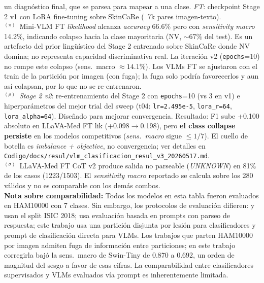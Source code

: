 \begin{table}[htbp]
\begin{minipage}{\textwidth}
  un diagnóstico final, que se parsea para mapear a una clase.
  \textit{FT}: checkpoint Stage 2 v1 con LoRA fine-tuning sobre SkinCaRe (~7k pares imagen-texto).\\[4pt]
  $^{(\pi)}$~Mini-VLM FT \textit{likelihood} alcanza \textit{accuracy} 66.6\% pero con
  \textit{sensitivity macro} 14.2\%, indicando colapso hacia la clase mayoritaria (NV, ${\sim}67\%$
  del test). Es un artefacto del prior lingüístico del Stage 2 entrenado sobre SkinCaRe
  donde NV domina; no representa capacidad discriminativa real.
  La iteración v2 (\texttt{epochs}=10) no rompe este colapso (sens.\ macro $\approx 14.1\%$).
  Los VLMs FT se ajustaron con el train de la partición por imagen (con fuga); la fuga solo podría
  favorecerlos y aun así colapsan, por lo que no se re-entrenaron.\\[4pt]
  $^{(\rho)}$~\textit{Stage 2 v2}: re-entrenamiento del Stage 2 con \texttt{epochs}=10 (vs 3 en v1)
  e hiperparámetros del mejor trial del sweep (t04: \texttt{lr=2.495e-5}, \texttt{lora\_r=64},
  \texttt{lora\_alpha=64}). Diseñado para mejorar convergencia. Resultado: F1 sube +0.100 absoluto
  en LLaVA-Med FT lik (+0.098$\to$0.198), pero \textbf{el class collapse persiste} en los modelos
  competitivos (\textit{sens.\ macro} sigue $\le 1/7$). El cuello de botella es \textit{imbalance + objective},
  no convergencia; ver detalles en \texttt{Codigo/docs/resul/vlm\_clasificacion\_resul\_v3\_20260517.md}.\\[4pt]
  $^{(\sigma)}$~LLaVA-Med FT CoT v2 produce salida no parseable (\textit{UNKNOWN}) en 81\% de los casos
  (1223/1503). El \textit{sensitivity macro} reportado se calcula sobre los 280 válidos y no es
  comparable con los demás combos.\\[4pt]
  \textbf{Nota sobre comparabilidad:}
  Todos los modelos en esta tabla fueron evaluados en HAM10000 con 7 clases.
  Sin embargo, los protocolos de evaluación difieren:
  \cite{SkinHealthMate2024} y~\cite{SkinSavvy22025} usan el split ISIC 2018;
  \cite{SkinR12025} usa evaluación basada en prompts con parseo de respuesta;
  este trabajo usa una partición disjunta por lesión para clasificadores y prompt
  de clasificación directa para VLMs. Los trabajos que parten HAM10000 por imagen admiten
  fuga de información entre particiones; en este trabajo corregirla bajó la sens.\ macro de Swin-Tiny
  de 0.870 a 0.692, un orden de magnitud del sesgo a favor de esas cifras.
  La comparabilidad entre clasificadores supervisados y VLMs evaluados
  vía prompt es inherentemente limitada.
\end{minipage}
\end{table}


